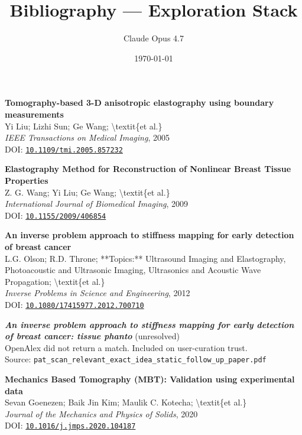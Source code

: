 \documentclass[11pt,a4paper]{article}
\title{\color{codeblue}\textbf{Bibliography --- Exploration Stack}}
\author{Claude Opus 4.7}
\date{\today}
\begin{document}
\maketitle
\thispagestyle{fancy}

\begin{enumerate}[leftmargin=*, label=\textbf{[\arabic*]}, itemsep=10pt]

\item 
\textbf{Tomography-based 3-D anisotropic elastography using boundary measurements}
\\
Yi Liu; Lizhi Sun; Ge Wang; \textbackslash{}textit\{et al.\}
\\
\textit{IEEE Transactions on Medical Imaging}, 2005
\\
DOI: \href{https://doi.org/10.1109/tmi.2005.857232}{\texttt{10.1109/tmi.2005.857232}}

\item 
\textbf{Elastography Method for Reconstruction of Nonlinear Breast Tissue Properties}
\\
Z. G. Wang; Yi Liu; Ge Wang; \textbackslash{}textit\{et al.\}
\\
\textit{International Journal of Biomedical Imaging}, 2009
\\
DOI: \href{https://doi.org/10.1155/2009/406854}{\texttt{10.1155/2009/406854}}

\item 
\textbf{An inverse problem approach to stiffness mapping for early detection of breast cancer}
\\
L.G. Olson; R.D. Throne; **Topics:** Ultrasound Imaging and Elastography, Photoacoustic and Ultrasonic Imaging, Ultrasonics and Acoustic Wave Propagation; \textbackslash{}textit\{et al.\}
\\
\textit{Inverse Problems in Science and Engineering}, 2012
\\
DOI: \href{https://doi.org/10.1080/17415977.2012.700710}{\texttt{10.1080/17415977.2012.700710}}

\item 
\textbf{\textit{An inverse problem approach to stiffness mapping for early detection of breast cancer: tissue phanto}} \textcolor{accentred}{(unresolved)}
\\
\textcolor{codegray}{\small OpenAlex did not return a match. Included on user-curation trust.}
\\\textcolor{codegray}{\small Source: \texttt{pat\_scan\_relevant\_exact\_idea\_static\_follow\_up\_paper.pdf}}

\item 
\textbf{Mechanics Based Tomography (MBT): Validation using experimental data}
\\
Sevan Goenezen; Baik Jin Kim; Maulik C. Kotecha; \textbackslash{}textit\{et al.\}
\\
\textit{Journal of the Mechanics and Physics of Solids}, 2020
\\
DOI: \href{https://doi.org/10.1016/j.jmps.2020.104187}{\texttt{10.1016/j.jmps.2020.104187}}


\end{enumerate}
\end{document}
